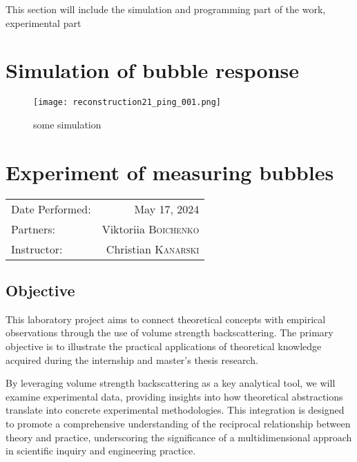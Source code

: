 This section will include the simulation and programming part of the work, experimental part

\section{Simulation of bubble response}

\begin{figure}[H]
    \centering
    \texttt{[image: reconstruction21\_ping\_001.png]}
    \caption*{some simulation}
    \label{fig:some-simulation}
\end{figure}

\section{Experiment of measuring bubbles}

\begin{center}
	\begin{tabular}{l r}
		Date Performed: & May 17, 2024 \\ %
		Partners: & Viktoriia \textsc{Boichenko} \\
		Instructor: & Christian \textsc{Kanarski} %
	\end{tabular}
\end{center}



\subsection{Objective}

This laboratory project aims to connect theoretical concepts with empirical observations through the use of volume strength backscattering. The primary objective is to illustrate the practical applications of theoretical knowledge acquired during the internship and master’s thesis research. 

By leveraging volume strength backscattering as a key analytical tool, we will examine experimental data, providing insights into how theoretical abstractions translate into concrete experimental methodologies. This integration is designed to promote a comprehensive understanding of the reciprocal relationship between theory and practice, underscoring the significance of a multidimensional approach in scientific inquiry and engineering practice.

